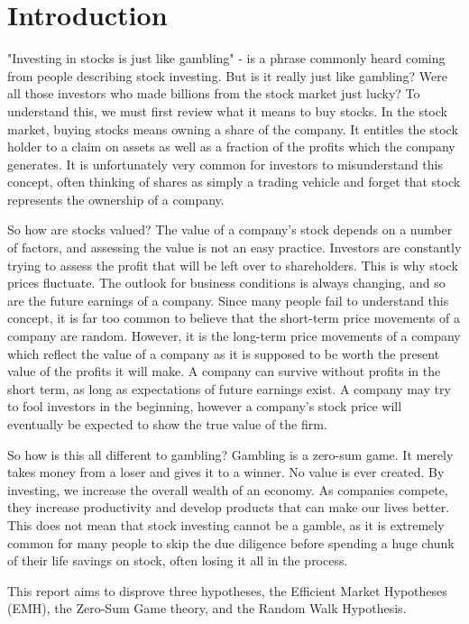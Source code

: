 \chapter{Introduction}

"Investing in stocks is just like gambling" - is a phrase commonly heard coming from people describing stock investing. But is it really just like gambling? Were all those investors who made billions from the stock market just lucky? To understand this, we must first review what it means to buy stocks. In the stock market, buying stocks means owning a share of the company. It entitles the stock holder to a claim on assets as well as a fraction of the profits which the company generates. It is unfortunately very common for investors to misunderstand this concept, often thinking of shares as simply a trading vehicle and forget that stock represents the ownership of a company. 

So how are stocks valued? The value of a company’s stock depends on a number of factors, and assessing the value is not an easy practice. Investors are constantly trying to assess the profit that will be left over to shareholders. This is why stock prices fluctuate. The outlook for business conditions is always changing, and so are the future earnings of a company. Since many people fail to understand this concept, it is far too common to believe that the short-term price movements of a company are random. However, it is the long-term price movements of a company which reflect the value of a company as it is supposed to be worth the present value of the profits it will make. A company can survive without profits in the short term, as long as expectations of future earnings exist. A company may try to fool investors in the beginning, however a company’s stock price will eventually be expected to show the true value of the firm.

So how is this all different to gambling? Gambling is a zero-sum game. It merely takes money from a loser and gives it to a winner. No value is ever created. By investing, we increase the overall wealth of an economy. As companies compete, they increase productivity and develop products that can make our lives better. This does not mean that stock investing cannot be a gamble, as it is extremely common for many people to skip the due diligence before spending a huge chunk of their life savings on stock, often losing it all in the process.

This report aims to disprove three hypotheses, the Efficient Market Hypotheses (EMH), the Zero-Sum Game theory, and the Random Walk Hypothesis.

